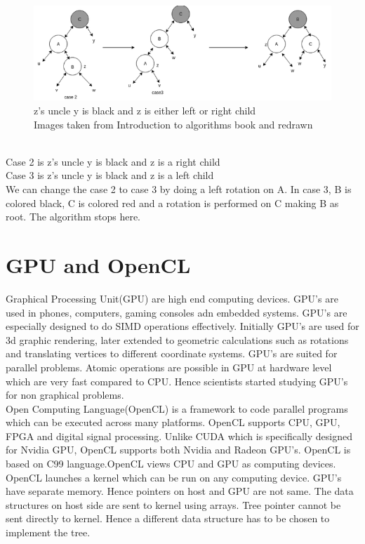 \documentclass[BTech]{iitmdiss}
\begin{document}
\begin{figure}[h]
    \centering
    \centerline{\includegraphics{rsz_case23.png}}
    \caption{z's uncle y is black and z is either left or right child\\Images taken from Introduction to algorithms book and redrawn}
    \label{fig:case2,3}
\end{figure}\\
Case 2 is z's uncle y is black and z is a right child\\
Case 3 is z's uncle y is black and z is a left child\\
We can change the case 2 to case 3 by doing a left rotation on A. In case 3, B is colored black, C is colored red and a rotation is performed on C making B as root. The algorithm stops here.\\

\section{GPU and OpenCL}
Graphical Processing Unit(GPU) are high end computing devices. GPU's are used in phones, computers, gaming consoles adn embedded systems. GPU's are especially designed to do SIMD operations effectively. Initially GPU's are used for 3d graphic rendering, later extended to geometric calculations such as rotations and translating vertices to different coordinate systems. GPU's are suited for parallel problems. Atomic operations are possible in GPU at hardware level which are very fast compared to CPU. Hence scientists started studying GPU's for non graphical problems.\\
Open Computing Language(OpenCL) is a framework to code parallel programs which can be executed across many platforms. OpenCL supports CPU, GPU, FPGA and digital signal processing. Unlike CUDA which is specifically designed for Nvidia GPU, OpenCL supports both Nvidia and Radeon GPU's. OpenCL is based on C99 language.OpenCL views CPU and GPU as computing devices. OpenCL launches a kernel which can be run on any computing device. GPU's have separate memory. Hence pointers on host and GPU are not same. The data structures on host side are sent to kernel using arrays. Tree pointer cannot be sent directly to kernel. Hence a different data structure has to be chosen to implement the tree.
\end{document}
